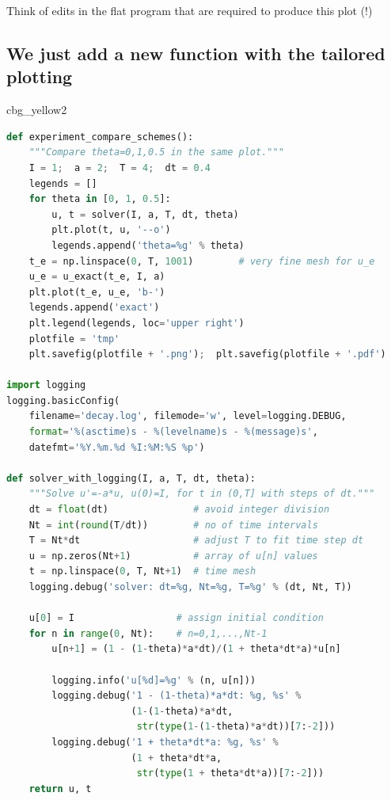 \documentclass[%
oneside,                 %
final,                   %
10pt]{article}
\newenvironment{_cod_tight}[1]{
   \def\FrameCommand{\colorbox{#1}}
   \FrameRule0.6pt\MakeFramed {\FrameRestore}\vskip3mm}
   {\vskip0mm\endMakeFramed}
\newenvironment{cod}[1]{
\bgroup\rmfamily
\fboxsep=0mm\relax
\begin{_cod_tight}{#1}
\list{}{\parsep=-2mm\parskip=0mm\topsep=0pt\leftmargin=2mm
\rightmargin=2\leftmargin\leftmargin=4pt\relax}
\item\relax}
{\endlist\end{_cod_tight}\egroup}
\begin{document}
Think of edits in the flat program that are required to produce this plot (!)

\subsection*{We just add a new function with the tailored plotting}

\begin{cod}{cbg_yellow2}\begin{lstlisting}[language=Python,style=simple,xleftmargin=2mm]
def experiment_compare_schemes():
    """Compare theta=0,1,0.5 in the same plot."""
    I = 1;  a = 2;  T = 4;  dt = 0.4
    legends = []
    for theta in [0, 1, 0.5]:
        u, t = solver(I, a, T, dt, theta)
        plt.plot(t, u, '--o')
        legends.append('theta=%g' % theta)
    t_e = np.linspace(0, T, 1001)        # very fine mesh for u_e
    u_e = u_exact(t_e, I, a)
    plt.plot(t_e, u_e, 'b-')
    legends.append('exact')
    plt.legend(legends, loc='upper right')
    plotfile = 'tmp'
    plt.savefig(plotfile + '.png');  plt.savefig(plotfile + '.pdf')

import logging
logging.basicConfig(
    filename='decay.log', filemode='w', level=logging.DEBUG,
    format='%(asctime)s - %(levelname)s - %(message)s',
    datefmt='%Y.%m.%d %I:%M:%S %p')

def solver_with_logging(I, a, T, dt, theta):
    """Solve u'=-a*u, u(0)=I, for t in (0,T] with steps of dt."""
    dt = float(dt)               # avoid integer division
    Nt = int(round(T/dt))        # no of time intervals
    T = Nt*dt                    # adjust T to fit time step dt
    u = np.zeros(Nt+1)           # array of u[n] values
    t = np.linspace(0, T, Nt+1)  # time mesh
    logging.debug('solver: dt=%g, Nt=%g, T=%g' % (dt, Nt, T))

    u[0] = I                  # assign initial condition
    for n in range(0, Nt):    # n=0,1,...,Nt-1
        u[n+1] = (1 - (1-theta)*a*dt)/(1 + theta*dt*a)*u[n]

        logging.info('u[%d]=%g' % (n, u[n]))
        logging.debug('1 - (1-theta)*a*dt: %g, %s' %
                      (1-(1-theta)*a*dt,
                       str(type(1-(1-theta)*a*dt))[7:-2]))
        logging.debug('1 + theta*dt*a: %g, %s' %
                      (1 + theta*dt*a,
                       str(type(1 + theta*dt*a))[7:-2]))
    return u, t
\end{lstlisting}\end{cod}
\noindent
\end{document}
